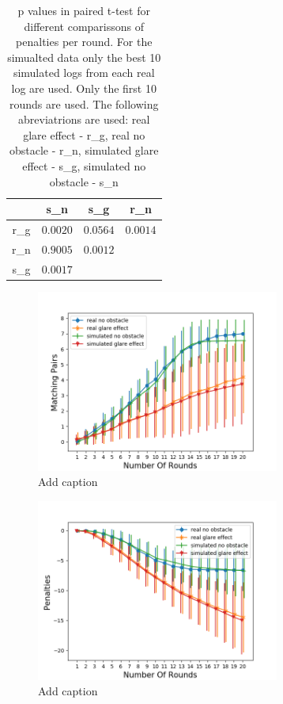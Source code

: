 \begin{table}[H]
	\centering
	\caption{p values in paired t-test for different comparissons of penalties per round. For the simualted data only the best 10 simulated logs from each real log are used. Only the first 10 rounds are used. The following abreviatrions are used: real glare effect - r\_g, real no obstacle - r\_n, simulated glare effect - s\_g, simulated no obstacle - s\_n}%
	\begin{tabular}{|c|c|c|c|}
		\hline
				& s\_n    &  s\_g  & r\_n 		\\
		\hline
		r\_g 	&$0.0020$&\textcolor{mygreen}{$0.0564$}&$0.0014$			\\
		r\_n 	&\textcolor{mygreen}{$0.9005$} &$0.0012$ &		  			\\
		s\_g 	&$0.0017$&		   &		  			\\
		\hline
	\end{tabular}
\end{table}

\begin{minipage}{0.5\textwidth}
	\begin{figure}[H]
		\centering
		\includegraphics[width=8cm]{images/sd10x/Figure_3.png}
		\caption[Bild kurz]{Add caption}
		\label{fig:simOp101}
	\end{figure}
\end{minipage}
\begin{minipage}{0.5\textwidth}
	\begin{figure}[H]
		\centering
		\includegraphics[width=8cm]{images/sd10x/Figure_4.png}
		\caption[Bild kurz]{Add caption}
		\label{fig:simOp102}
	\end{figure}
\end{minipage} 

